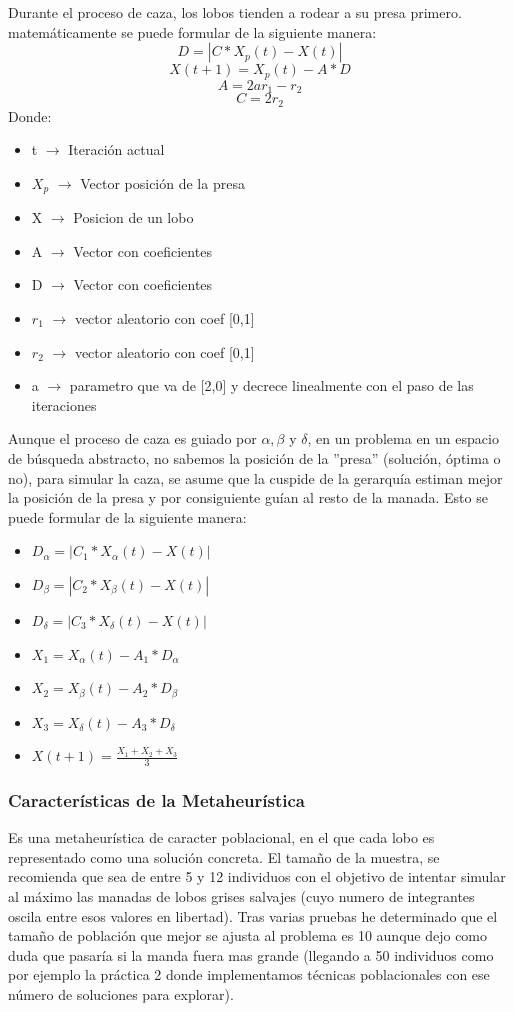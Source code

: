 \documentclass[a4paper, 12.5pt]{report}
\begin{document}
Durante el proceso de caza, los lobos tienden a rodear a su presa primero. matemáticamente se puede formular de la siguiente manera:
$$D=|C*X_p(t)-X(t)| $$
$$X(t+1)=X_p(t)-A*D$$
$$A=2ar_1-r_2$$
$$C=2r_2$$
Donde:
\begin{itemize}
    \item t $\rightarrow$ Iteración actual
    \item $X_p$ $\rightarrow$ Vector posición de la presa
    \item X $\rightarrow$ Posicion de un lobo
    \item A $\rightarrow$ Vector con coeficientes
    \item D $\rightarrow$ Vector con coeficientes
    \item $r_1$ $\rightarrow$ vector aleatorio con coef [0,1]
    \item $r_2$ $\rightarrow$ vector aleatorio con coef [0,1]
    \item a $\rightarrow$ parametro que va de [2,0] y decrece linealmente con el paso de las iteraciones
\end{itemize}


Aunque el proceso de caza es guiado por $\alpha,\beta$ y $\delta$, en un problema en un espacio de búsqueda abstracto, no sabemos la posición de la ''presa'' (solución, óptima o no), para simular la caza, se asume que la cuspide de la gerarquía estiman mejor la posición de la presa y por consiguiente guían al resto de la manada. Esto se puede formular de la siguiente manera:


\begin{itemize}
    \item $D_\alpha=|C_1*X_\alpha(t)-X(t)| $
    \item $D_\beta=|C_2*X_\beta(t)-X(t)| $
    \item $D_\delta=|C_3*X_\delta(t)-X(t)| $
    \item $X_1=X_\alpha(t)-A_1*D_\alpha$
    \item $X_2=X_\beta(t)-A_2*D_\beta$
    \item $X_3=X_\delta(t)-A_3*D_\delta$
    \item $X(t+1)=\frac{X_1+X_2+X_3}{3}$
\end{itemize}

\subsubsection{Características de la Metaheurística}

Es una metaheurística de caracter poblacional, en el que cada lobo es representado como una solución concreta. El tamaño de la muestra, se recomienda que sea de entre 5 y 12 individuos con el objetivo de intentar simular al máximo las manadas de lobos grises salvajes (cuyo numero de integrantes oscila entre esos valores en libertad). Tras varias pruebas he determinado que el tamaño de población que mejor se ajusta al problema es 10 aunque dejo como duda que pasaría si la manda fuera mas grande (llegando a 50 individuos como por ejemplo la práctica 2 donde implementamos técnicas poblacionales con ese número de soluciones para explorar).
\end{document}
